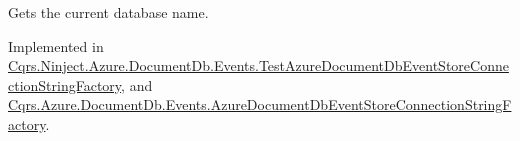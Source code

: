 Gets the current database name. 



Implemented in \hyperlink{classCqrs_1_1Ninject_1_1Azure_1_1DocumentDb_1_1Events_1_1TestAzureDocumentDbEventStoreConnectionStringFactory_a85b4e6cd45d285be6de5db19148118b9_a85b4e6cd45d285be6de5db19148118b9}{Cqrs.\+Ninject.\+Azure.\+Document\+Db.\+Events.\+Test\+Azure\+Document\+Db\+Event\+Store\+Connection\+String\+Factory}, and \hyperlink{classCqrs_1_1Azure_1_1DocumentDb_1_1Events_1_1AzureDocumentDbEventStoreConnectionStringFactory_af243f79315140e1f2c20a5c1695f4fb9_af243f79315140e1f2c20a5c1695f4fb9}{Cqrs.\+Azure.\+Document\+Db.\+Events.\+Azure\+Document\+Db\+Event\+Store\+Connection\+String\+Factory}.

